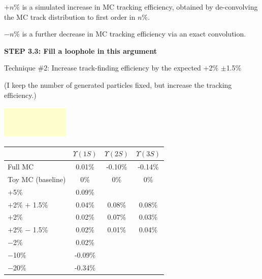 \documentclass[landscape]{article}
\begin{document}
\vfill

$+n$\% is a simulated increase in MC tracking efficiency, obtained by
de-convolving the MC track distribution to first order in $n$\%.

\vfill

$-n$\% is a further decrease in MC tracking efficiency via an exact
convolution.

\pagebreak

\vspace{1 cm}

{\bf STEP 3.3: Fill a loophole in this argument}

\vfill

Technique \#2:  Increase track-finding efficiency by the expected +2\% $\pm$1.5\%

\vfill

(I keep the number of generated particles fixed, but increase the tracking efficiency.)

\vfill

\vspace{4.5 cm}
\includegraphics[width=\linewidth, height=3.4 cm]{yellow.pdf}
\vspace{-4.5 cm}
\vspace{-0.4 cm}
\vspace{-4.05 cm}

\begin{center}
  \renewcommand{\arraystretch}{1.25}
  \begin{tabular}{p{12 cm} c c c}
  & \mbox{\hspace{0.5 cm}} $\Upsilon(1S)$ \mbox{\hspace{0.5 cm}} & \mbox{\hspace{0.5 cm}} $\Upsilon(2S)$ \mbox{\hspace{0.5 cm}} & \mbox{\hspace{0.5 cm}} $\Upsilon(3S)$ \mbox{\hspace{0.5 cm}} \\\hline
  Full MC           &  0.01\% & -0.10\% & -0.14\% \\
  Toy MC (baseline) &  0\%    &  0\%    &  0\% \\
  $+$5\%            &  0.09\% & & \\
  $+$2\% $+$ 1.5\%  &  0.04\% &  0.08\% &  0.08\% \\
  $+$2\%            &  0.02\% &  0.07\% &  0.03\% \\
  $+$2\% $-$ 1.5\%  &  0.02\% &  0.01\% &  0.04\% \\
  $-$2\%            &  0.02\% & & \\
  $-$10\%           & -0.09\% & & \\
  $-$20\%           & -0.34\% & & \\
  \end{tabular}
\end{center}
\end{document}
